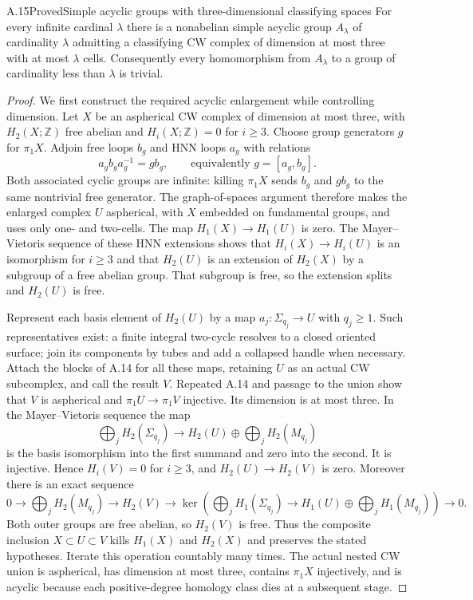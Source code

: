 \begin{claim}{A.15}{Proved}{Simple acyclic groups with three-dimensional classifying spaces}
For every infinite cardinal $\lambda$ there is a nonabelian simple
acyclic group $A_\lambda$ of cardinality $\lambda$ admitting a
classifying CW complex of dimension at most three with at most
$\lambda$ cells. Consequently every homomorphism from
$A_\lambda$ to a group of cardinality less than $\lambda$ is trivial.
\end{claim}
\begin{proof}
We first construct the required acyclic enlargement while
controlling dimension. Let $X$ be an aspherical CW complex of
dimension at most three, with $H_2(X;\mathbb Z)$ free abelian and
$H_i(X;\mathbb Z)=0$ for $i\geq3$. Choose group generators $g$
for $\pi_1X$. Adjoin free loops $b_g$ and HNN loops $a_g$ with
relations
\[
 a_g b_g a_g^{-1}=g b_g,
 \qquad\text{equivalently }g=[a_g,b_g].
\]
Both associated cyclic groups are infinite: killing $\pi_1X$
sends $b_g$ and $g b_g$ to the same nontrivial free generator.
The graph-of-spaces argument therefore makes the enlarged
complex $U$ aspherical, with $X$ embedded on fundamental groups,
and uses only one- and two-cells. The map $H_1(X)\to H_1(U)$
is zero. The Mayer--Vietoris sequence of these HNN extensions
shows that $H_i(X)\to H_i(U)$ is an isomorphism for $i\geq3$
and that $H_2(U)$ is an extension of $H_2(X)$ by a subgroup of
a free abelian group. That subgroup is free, so the extension
splits and $H_2(U)$ is free.

Represent each basis element of $H_2(U)$ by a map
$a_j:\Sigma_{q_j}\to U$ with $q_j\geq1$. Such representatives
exist: a finite integral two-cycle resolves to a closed oriented
surface; join its components by tubes and add a collapsed handle
when necessary. Attach the blocks of A.14 for all these maps,
retaining $U$ as an actual CW subcomplex, and call the result $V$.
Repeated A.14 and passage to the union show that $V$ is aspherical
and $\pi_1U\to\pi_1V$ injective. Its dimension is at most three.
In the Mayer--Vietoris sequence the map
\[
 \bigoplus_j H_2(\Sigma_{q_j})\longrightarrow
 H_2(U)\oplus\bigoplus_j H_2(M_{q_j})
\]
is the basis isomorphism into the first summand and zero into
the second. It is injective. Hence $H_i(V)=0$ for $i\geq3$,
and $H_2(U)\to H_2(V)$ is zero. Moreover there is an exact sequence
\[
 0\longrightarrow\bigoplus_j H_2(M_{q_j})
 \longrightarrow H_2(V)
 \longrightarrow
 \ker\left(\bigoplus_j H_1(\Sigma_{q_j})
       \to H_1(U)\oplus\bigoplus_j H_1(M_{q_j})\right)
 \longrightarrow0.
\]
Both outer groups are free abelian, so $H_2(V)$ is free.
Thus the composite inclusion $X\subset U\subset V$ kills
$H_1(X)$ and $H_2(X)$ and preserves the stated hypotheses.
Iterate this operation countably many times. The actual nested
CW union is aspherical, has dimension at most three, contains
$\pi_1X$ injectively, and is acyclic because each positive-degree
homology class dies at a subsequent stage.


\end{proof}
